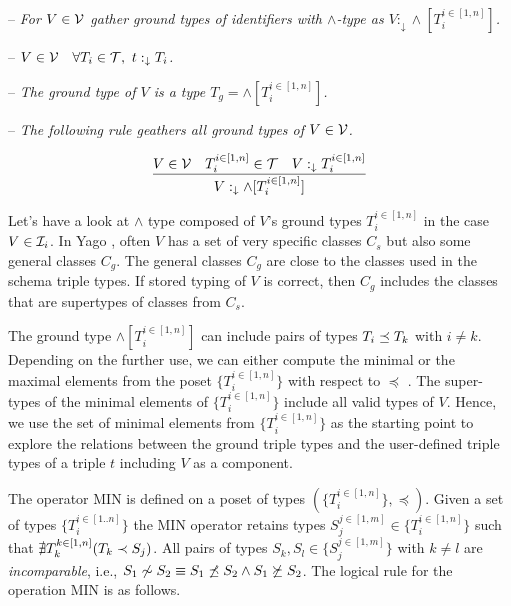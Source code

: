 \documentclass[runningheads]{llncs}
\newcommand{\darr}{\downarrow}
\newcommand{\I}{{\cal I}}
\newcommand{\V}{{\cal V}}
\newcommand{\T}{{\cal T}}
\newcommand{\memo}[1]{}
\newcommand{\notes}[1]{\noindent\begin{small}-- \emph{#1}\hfill\break\end{small}}
\newcommand{\nnotes}[1]{\indent\begin{small}-- \emph{#1}\hfill\break\end{small}}
\newcommand{\ennotes}[1]{\indent\begin{small}-- \emph{#1}\hfill\end{small}}
\begin{document}
\notes{For $V\in\V$ gather ground types of identifiers with $\land$-type as $V:_{\darr}\land[T_i^{i\in[1,n]}]$.}
\nnotes{$V\in\V\quad\forall\/T_i\in\T,\ t:_{\darr}T_i$.}
\nnotes{The ground type of $V$ is a type $T_g=\land[T_i^{i\in[1,n]}]$.}
\ennotes{The following rule geathers all ground types of $V\in\V$.}

\begin{equation}
\label{rul:land-1}
\dfrac{V\in\V\quad\/T_i^{i\in[1,n]}\in\T\quad\/V:_{\darr}T_i^{i\in[1,n]}}
      {V:_{\darr}\land[T_i^{i\in[1,n]}]}
\end{equation}

Let's have a look at $\land$ type composed of $V$'s ground types
$T_i^{i\in[1,n]}$ in the case $V\in\I_i$. In Yago \cite{Hoffart2013},
often $V$ has a set of very specific classes $C_s$ but also some
general classes $C_g$. The general classes $C_g$ are close to the
classes used in the schema triple types. If stored typing of $V$ is
correct, then $C_g$ includes the classes that are supertypes of
classes from $C_s$.

The ground type $\land[T_i^{i\in[1,n]}]$ can include pairs of types
$T_i\preceq\/T_k$ with $i\not=k$. Depending on the further use, we can
either compute the minimal or the maximal elements from the poset
$\{T_i^{i\in[1,n]}\}$ with respect to $\preceq$
\cite{DaveyPriestley2002}. The super-types of the minimal elements of
$\{T_i^{i\in[1,n]}\}$ include all valid types of $V$. Hence, we use
the set of minimal elements from $\{T_i^{i\in[1,n]}\}$ as the starting
point to explore the relations between the ground triple types and the
user-defined triple types of a triple $t$ including $V$ as a
component.

\memo{
the type $\land[T_i^{i\in[1,n]}]$ It makes sense
either to compute MIN or MAX of $\land[T_i^{i\in[1,n]}]$ yielding
$\land[S_1..S_m]$ where $m\le\/n$ and
$S_j^{j\in[1,m]}\in\{T_i^{i\in[1,n]}\}$. The operator MIN computes
$S_j^{j\in[1,m]}$ such that each $S_j$ is minimal among
$T_i^{i\in[1,n]}$. The operator MAX computes $S_j^{j\in[1,m]}$ such
that each $S_j$ is maximal among $T_i^{i\in[1,n]}$. Note that in both
cases there are no pairs among $S_j^{j\in[1,m]}$ related by $\preceq$.}

The operator MIN is defined on a poset of types
$(\{T_i^{i\in[1,n]}\},\preceq)$. Given a set of types $\{T_i^{i\in[1..n]}\}$
the MIN operator retains types $S_j^{j\in[1,m]}\in\{T_i^{i\in[1,n]}\}$
such that ${\nexists}\/T_k^{k\in[1,n]}(T_k\prec\/S_j)$. All pairs of
types $S_k,S_l\in\{S_j^{j\in[1,m]}\}$ with $k\not=l$ are
\emph{incomparable}, i.e.,
$S_1\not\sim\/S_2\equiv\/S_1\not\preceq\/S_2\land\/S_1\not\succeq\/S_2$.
The logical rule for the operation MIN is as follows.
\end{document}
